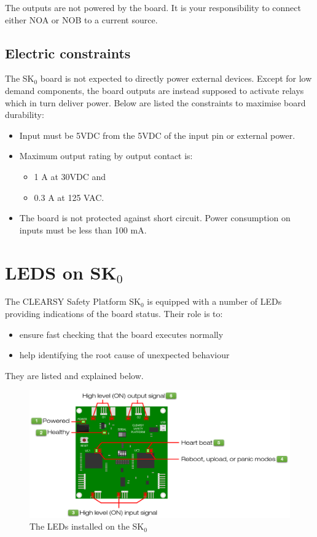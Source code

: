 The outputs are not powered by the board. It is your responsibility to connect either NOA or NOB to a current source.

\section{Electric constraints}

The SK$_0$ board is not expected to directly power external devices. Except for low demand components, the board outputs are instead supposed to activate relays which in turn deliver power. Below are listed the constraints to maximise board durability:  
\begin{itemize}
    \item Input must be 5VDC from the 5VDC of the input pin or external power.
    \item Maximum output rating by output contact is:
    \begin{itemize}
        \item 1 A at 30VDC and
        \item  0.3 A at 125 VAC.
    \end{itemize}
    \item The board is not protected against short circuit. Power consumption on inputs must be less than 100 mA.
\end{itemize}


\chapter{LEDS on SK$_0$}


The CLEARSY Safety Platform SK$_0$ is equipped with a number of LEDs providing indications of the board status. Their role is to:
\begin{itemize}
    \item ensure fast checking that the board executes normally
    \item help identifying the root cause of unexpected behaviour
\end{itemize}
 They are listed and explained below.

\begin{figure}[h]
\centering\includegraphics[scale=0.28]{Pictures/chapterAnnexes/SK0-lights.png}
\caption{The LEDs installed on the SK$_0$}
\label{annexes:SK0-HW-light}
\end{figure}

